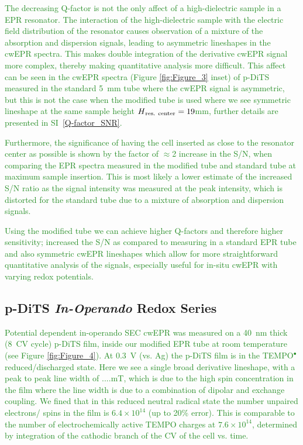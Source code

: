\documentclass{WileyMSP-template}
\newcommand{\np}[1]{\textcolor{ForestGreen}{#1}}
\begin{document}
\bigbreak

\np{
The decreasing Q-factor is not the only affect of a high-dielectric sample in a EPR resonator. The interaction of the high-dielectric sample with the electric field distribution of the resonator causes observation of a mixture of the absorption and dispersion signals, leading to asymmetric lineshapes in the cwEPR spectra. This makes double integration of the derivative cwEPR signal more complex, thereby making quantitative analysis more difficult. This affect can be seen in the cwEPR spectra (Figure \ref{fig:Figure_3} inset) of p-DiTS measured in the standard 5~mm tube where the cwEPR signal is asymmetric, but this is not the case when the modified tube is used where we see symmetric lineshape at the same sample height $H\textsubscript{res. center} = 19$mm, further details are presented in SI~\ref{Q-factor_SNR}. 
}

\bigbreak

\np{Furthermore, the significance of having the cell inserted as close to the resonator center as possible is shown by the factor of $\approx$2 increase in the S/N, when comparing the EPR spectra measured in the modified tube and standard tube at maximum sample insertion. This is most likely a lower estimate of the increased S/N ratio as the signal intensity was measured at the peak intensity, which is distorted for the standard tube due to a mixture of absorption and dispersion signals. }

\bigbreak

\np{
Using the modified tube we can achieve higher Q-factors and therefore higher sensitivity; increased the S/N as compared to measuring in a standard EPR tube and also symmetric cwEPR lineshapes which allow for more straightforward quantitative analysis of the signals, especially useful for in-situ cwEPR with varying redox potentials. 
}
\bigbreak

\subsection*{p-DiTS \textit{In-Operando} Redox Series}

\np{Potential dependent in-operando SEC cwEPR was measured on a 40~nm thick (8~CV cycle) p-DiTS film, inside our modified EPR tube at room temperature (see Figure \ref{fig:Figure_4}). At 0.3~V (vs. Ag) the p-DiTS film is in the TEMPO$^{\bullet}$ reduced/discharged state. Here we see a single broad derivative lineshape, with a peak to peak line width of ....mT, which is due to the high spin concentration in the film where the line width is due to a combination of dipolar and exchange coupling. We fined that in this reduced neutral radical state the number unpaired electrons/ spins in the film is $6.4\times10^{14}$ (up to 20\% error). This is comparable to the number of electrochemically active TEMPO charges at $7.6\times10^{14}$, determined by integration of the cathodic branch of the CV of the cell vs. time.}
\end{document}
